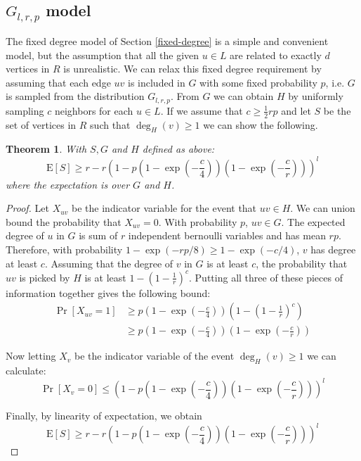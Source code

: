 \documentclass[]{article}
\newcommand{\E}{\text{E}}
\newtheorem{thm}{Theorem}
\begin{document}
\subsection{$G_{l,r,p}$ model}
\label{gnmp}
The fixed degree model of Section \ref{fixed-degree} is a simple and convenient model, but the assumption that all the given $u\in L$ are related to exactly $d$ vertices in $R$ is unrealistic. We can relax this fixed degree requirement by assuming that each edge $uv$ is included in $G$ with some fixed probability $p$, i.e. $G$ is sampled from the distribution $G_{l,r,p}$. From $G$ we can obtain $H$ by uniformly sampling $c$ neighbors for each $u\in L$. If we assume that $c\geq\frac{1}{2}rp$ and let $S$ be the set of vertices in $R$ such that $\deg_H(v)\geq 1$ we can show the following.

\begin{thm}
With $S,G$ and $H$ defined as above:
\[ \E[S] \geq r - r\left(1-p\left(1-\exp\left(-\frac{c}{4}\right)\right)\left(1-\exp\left(-\frac{c}{r}\right)\right)\right)^l\]
where the expectation is over $G$ and $H$.
\end{thm}
\begin{proof}
Let $X_{uv}$ be the indicator variable for the event that $uv\in H$. 
We can union bound the probability that $X_{uv}=0$. With probability 
$p$, $uv\in G$. The expected degree of $u$ in $G$ is sum of $r$
 independent bernoulli variables and has mean $rp$. Therefore, with 
probability $1-\exp(-rp/8) \geq 1 - \exp(-c/4)$, $v$ has degree at
least $c$. Assuming that the degree of $v$ in $G$ is at least $c$,
the probability that $uv$ is picked by $H$ is at least 
$1-\left(1-\frac{1}{r}\right)^c$. Putting all three of these pieces 
of information together gives the following bound:
\begin{align*}
\Pr[X_{uv}=1] &\geq p\left(1-\exp\left(-\frac{c}{4}\right)\right)\left(1-\left(1-\frac{1}{r}\right)^c\right) \\
              &\geq p\left(1-\exp\left(-\frac{c}{4}\right)\right)\left(1-\exp\left(-\frac{c}{r}\right)\right)
\end{align*}

Now letting $X_v$ be the indicator variable of the event 
$\deg_H(v) \geq 1$ we can calculate:
\[ \Pr[X_v=0] \leq \left(1-p\left(1-\exp\left(-\frac{c}{4}\right)\right)\left(1-\exp\left(-\frac{c}{r}\right)\right)\right)^l \]

Finally, by linearity of expectation, we obtain
\[ \E[S] \geq r - r\left(1-p\left(1-\exp\left(-\frac{c}{4}\right)\right)\left(1-\exp\left(-\frac{c}{r}\right)\right)\right)^l\]
\end{proof}
\end{document}
